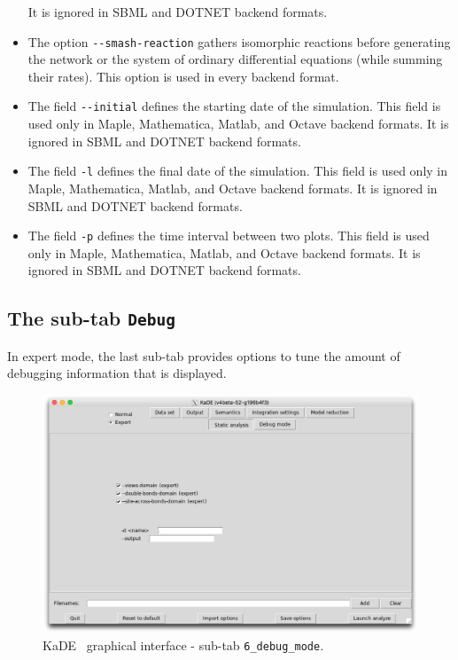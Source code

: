 \documentclass[11pt]{book}
\def\KaDE{\textsf{KaDE}}
\begin{document}
\begin{itemize}
  It is ignored in SBML and DOTNET backend formats.
  \item The option \texttt{-{}-smash-reaction} gathers isomorphic reactions before generating the network or the system of ordinary differential equations (while summing their rates). This option is used in every backend format.
  \item The field \texttt{-{}-initial} defines the starting date of the simulation. This field is used only in Maple, Mathematica, Matlab, and Octave backend formats.
  It is ignored in SBML and DOTNET backend formats.
  \item The field \texttt{-l} defines the final date of the simulation. This field is used only in Maple, Mathematica, Matlab, and Octave backend formats.
  It is ignored in SBML and DOTNET backend formats.
  \item The field \texttt{-p} defines the time interval between two plots. This field is used only in Maple, Mathematica, Matlab, and Octave backend formats.
  It is ignored in SBML and DOTNET backend formats.
\end{itemize}

\subsection{The sub-tab \texttt{Debug}}
\label{kade:debug}
In expert mode, the last sub-tab provides options to tune the amount of debugging information that is displayed.

\begin{figure}[htbp]
\centering
\includegraphics[width=12cm,bb=0 0 1904 1208]{img/kade_5.png}
\caption{\KaDE~ graphical interface - sub-tab \texttt{6\_debug\_mode}.}
\label{fig:kade:6}
\end{figure}
\end{document}
